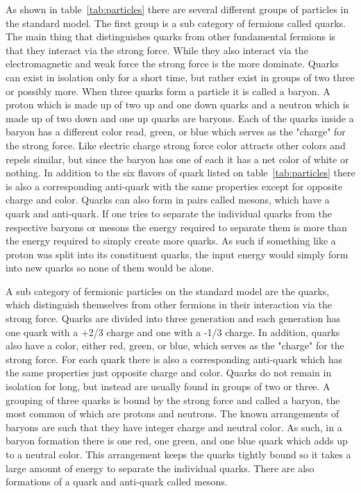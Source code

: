 As shown in table~\ref{tab:particles} there are several different groups of particles in the standard model. The first group is a sub category of fermions called quarks. The main thing that distinguishes quarks from other fundamental fermions is that they interact via the strong force. While they also interact via the electromagnetic and weak force the strong force is the more dominate. Quarks can exist in isolation only for a short time, but rather exist in groups of two three or possibly more. When three quarks form a particle it is called a baryon. A proton which is made up of two up and one down quarks and a neutron which is made up of two down and one up quarks are baryons. Each of the quarks inside a baryon has a different color read, green, or blue which serves as the "charge" for the strong force. Like electric charge strong force color attracts other colors and repels similar, but since the baryon has one of each it has a net color of white or nothing. In addition to the six flavors of quark listed on table~\ref{tab:particles} there is also a corresponding anti-quark with the same properties except for opposite charge and color. Quarks can also form in pairs called mesons, which have a quark and anti-quark. If one tries to separate the individual quarks from the respective baryons or mesons the energy required to separate them is more than the energy required to simply create more quarks. As such if something like a proton was split into its constituent quarks, the input energy would simply form into new quarks so none of them would be alone. 

A sub category of fermionic particles on the standard model are the quarks, which distinguish themselves from other fermions in their interaction via the strong force. Quarks are divided into three generation and each generation has one quark with a +2/3 charge and one with a -1/3 charge. In addition, quarks also have a color, either red, green, or blue, which serves as the "charge" for the strong force. For each quark there is also a corresponding anti-quark which has the same properties just opposite charge and color. Quarks do not remain in isolation for long, but instead are usually found in groups of two or three. A grouping of three quarks is bound by the strong force and called a baryon, the most common of which are protons and neutrons. The known arrangements of baryons are such that they have integer charge and neutral color. As such, in a baryon formation there is one red, one green, and one blue quark which adds up to a neutral color. This arrangement keeps the quarks tightly bound so it takes a large amount of energy to separate the individual quarks. There are also formations of a quark and anti-quark called mesons.  

